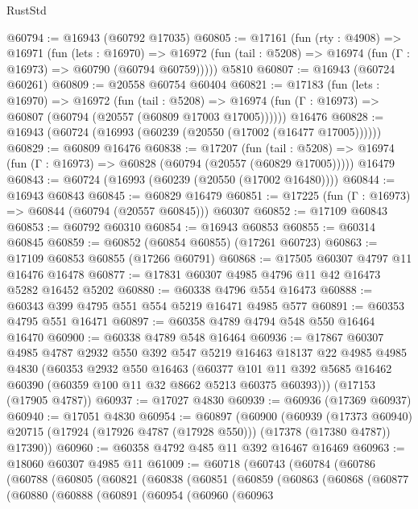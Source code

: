 \begin{lexlean}{RustStd}
\begin{coremodule}
@60794 := @16943 (@60792 @17035)
@60805 := @17161
    (fun (rty : @4908) =>
    @16971
      (fun (lets : @16970) =>
      @16972 (fun (tail : @5208) => @16974 (fun (Γ : @16973) => @60790 (@60794 @60759)))))
    @5810
@60807 := @16943 (@60724 @60261)
@60809 := @20558 @60754 @60404
@60821 := @17183
    (fun (lets : @16970) =>
    @16972
      (fun (tail : @5208) =>
      @16974 (fun (Γ : @16973) => @60807 (@60794 (@20557 (@60809 @17003 @17005))))))
    @16476
@60828 := @16943 (@60724 (@16993 (@60239 (@20550 (@17002 (@16477 @17005))))))
@60829 := @60809 @16476
@60838 := @17207
    (fun (tail : @5208) => @16974 (fun (Γ : @16973) => @60828 (@60794 (@20557 (@60829 @17005)))))
    @16479
@60843 := @60724 (@16993 (@60239 (@20550 (@17002 @16480))))
@60844 := @16943 @60843
@60845 := @60829 @16479
@60851 := @17225 (fun (Γ : @16973) => @60844 (@60794 (@20557 @60845))) @60307
@60852 := @17109 @60843
@60853 := @60792 @60310
@60854 := @16943 @60853
@60855 := @60314 @60845
@60859 := @60852 (@60854 @60855) (@17261 @60723)
@60863 := @17109 @60853 @60855 (@17266 @60791)
@60868 := @17505 @60307 @4797 @11 @16476 @16478
@60877 := @17831 @60307 @4985 @4796 @11 @42 @16473 @5282 @16452 @5202
@60880 := @60338 @4796 @554 @16473
@60888 := @60343 @399 @4795 @551 @554 @5219 @16471 @4985 @577
@60891 := @60353 @4795 @551 @16471
@60897 := @60358 @4789 @4794 @548 @550 @16464 @16470
@60900 := @60338 @4789 @548 @16464
@60936 := @17867
    @60307
    @4985
    @4787
    @2932
    @550
    @392
    @547
    @5219
    @16463
    @18137
    @22
    @4985
    @4985
    @4830
    (@60353
      @2932
      @550
      @16463
      (@60377 @101 @11 @392 @5685 @16462 @60390 (@60359 @100 @11 @32 @8662 @5213 @60375 @60393)))
    (@17153 (@17905 @4787))
@60937 := @17027 @4830
@60939 := @60936 (@17369 @60937)
@60940 := @17051 @4830
@60954 := @60897
    (@60900
      (@60939
        (@17373 @60940)
        @20715
        (@17924 (@17926 @4787 (@17928 @550)))
        (@17378 (@17380 @4787))
        @17390))
@60960 := @60358 @4792 @485 @11 @392 @16467 @16469
@60963 := @18060 @60307 @4985 @11
@61009 := @60718
    (@60743
      (@60784
        (@60786
          (@60788
            (@60805
              (@60821
                (@60838
                  (@60851
                    (@60859
                      (@60863
                        (@60868
                          (@60877
                            (@60880
                              (@60888
                                (@60891
                                  (@60954
                                    (@60960
                                      (@60963

\end{coremodule}
\end{lexlean}
